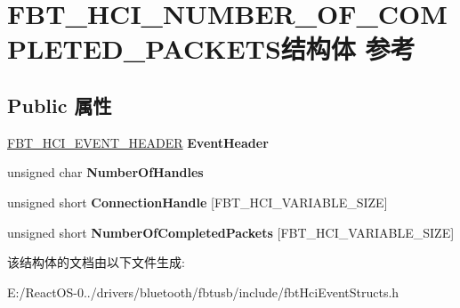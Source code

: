 \hypertarget{struct_f_b_t___h_c_i___n_u_m_b_e_r___o_f___c_o_m_p_l_e_t_e_d___p_a_c_k_e_t_s}{}\section{F\+B\+T\+\_\+\+H\+C\+I\+\_\+\+N\+U\+M\+B\+E\+R\+\_\+\+O\+F\+\_\+\+C\+O\+M\+P\+L\+E\+T\+E\+D\+\_\+\+P\+A\+C\+K\+E\+T\+S结构体 参考}
\label{struct_f_b_t___h_c_i___n_u_m_b_e_r___o_f___c_o_m_p_l_e_t_e_d___p_a_c_k_e_t_s}
\subsection*{Public 属性}
\begin{DoxyCompactItemize}
\item 
\mbox{\label{struct_f_b_t___h_c_i___n_u_m_b_e_r___o_f___c_o_m_p_l_e_t_e_d___p_a_c_k_e_t_s_abfdc6d7a8dddea8555a1adcb36d55647}} 
\hyperlink{struct_f_b_t___h_c_i___e_v_e_n_t___h_e_a_d_e_r}{F\+B\+T\+\_\+\+H\+C\+I\+\_\+\+E\+V\+E\+N\+T\+\_\+\+H\+E\+A\+D\+ER} {\bfseries Event\+Header}
\item 
\mbox{\label{struct_f_b_t___h_c_i___n_u_m_b_e_r___o_f___c_o_m_p_l_e_t_e_d___p_a_c_k_e_t_s_a097efa22e1b6e8404a5d7bc49c38a958}} 
unsigned char {\bfseries Number\+Of\+Handles}
\item 
\mbox{\label{struct_f_b_t___h_c_i___n_u_m_b_e_r___o_f___c_o_m_p_l_e_t_e_d___p_a_c_k_e_t_s_a9a38cd34b3c33d0f170e6a73f47a36ec}} 
unsigned short {\bfseries Connection\+Handle} \mbox{[}F\+B\+T\+\_\+\+H\+C\+I\+\_\+\+V\+A\+R\+I\+A\+B\+L\+E\+\_\+\+S\+I\+ZE\mbox{]}
\item 
\mbox{\label{struct_f_b_t___h_c_i___n_u_m_b_e_r___o_f___c_o_m_p_l_e_t_e_d___p_a_c_k_e_t_s_a8e309ed57e930483f868ded47e00a0eb}} 
unsigned short {\bfseries Number\+Of\+Completed\+Packets} \mbox{[}F\+B\+T\+\_\+\+H\+C\+I\+\_\+\+V\+A\+R\+I\+A\+B\+L\+E\+\_\+\+S\+I\+ZE\mbox{]}
\end{DoxyCompactItemize}


该结构体的文档由以下文件生成\+:\begin{DoxyCompactItemize}
\item 
E\+:/\+React\+O\+S-\/0../drivers/bluetooth/fbtusb/include/fbt\+Hci\+Event\+Structs.\+h\end{DoxyCompactItemize}
